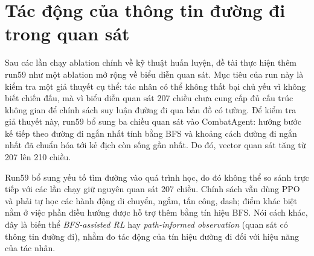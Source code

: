 \section{Tác động của thông tin đường đi trong quan sát}
\label{sec:run59_path_informed}

Sau các lần chạy ablation chính về kỹ thuật huấn luyện, đề tài thực hiện thêm run59 như một ablation mở rộng về biểu diễn quan sát. Mục tiêu của run này là kiểm tra một giả thuyết cụ thể: tác nhân có thể không thất bại chủ yếu vì không biết chiến đấu, mà vì biểu diễn quan sát 207 chiều chưa cung cấp đủ cấu trúc không gian để chính sách suy luận đường đi qua bản đồ có tường. Để kiểm tra giả thuyết này, run59 bổ sung ba chiều quan sát vào CombatAgent: hướng bước kế tiếp theo đường đi ngắn nhất tính bằng BFS và khoảng cách đường đi ngắn nhất đã chuẩn hóa tới kẻ địch còn sống gần nhất. Do đó, vector quan sát tăng từ 207 lên 210 chiều.

Run59 bổ sung yếu tố tìm đường vào quá trình học, do đó không thể so sánh trực tiếp với các lần chạy giữ nguyên quan sát 207 chiều. Chính sách vẫn dùng PPO và phải tự học các hành động di chuyển, ngắm, tấn công, dash; điểm khác biệt nằm ở việc phần điều hướng được hỗ trợ thêm bằng tín hiệu BFS. Nói cách khác, đây là biến thể \emph{BFS-assisted RL} hay \emph{path-informed observation} (quan sát có thông tin đường đi), nhằm đo tác động của tín hiệu đường đi đối với hiệu năng của tác nhân.

